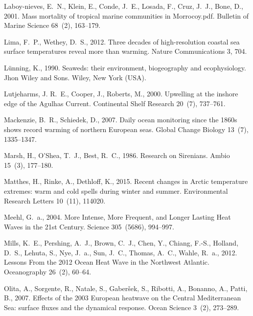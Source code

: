 \documentclass[a4paper,10pt,review]{elsarticle}
\begin{document}
\begin{thebibliography}{52}
Laboy-nieves, E.~N., Klein, E., Conde, J.~E., Losada, F., Cruz, J.~J., Bone,
  D., 2001. {Mass mortality of tropical marine communities in Morrocoy.pdf}.
  Bulletin of Marine Science 68~(2), 163--179.

Lima, F.~P., Wethey, D.~S., 2012. {Three decades of high-resolution coastal sea
  surface temperatures reveal more than warming}. Nature Communications 3, 704.

L{\"{u}}nning, K., 1990. {Seaweds: their environment, biogeography and
  ecophysiology. Jhon Wiley and Sons}. Wiley, New York (USA).

Lutjeharms, J. R.~E., Cooper, J., Roberts, M., 2000. {Upwelling at the inshore
  edge of the Agulhas Current}. Continental Shelf Research 20~(7), 737--761.

Mackenzie, B.~R., Schiedek, D., 2007. {Daily ocean monitoring since the 1860s
  shows record warming of northern European seas}. Global Change Biology
  13~(7), 1335--1347.

Marsh, H., O'Shea, T.~J., Best, R.~C., 1986. {Research on Sirenians}. Ambio
  15~(3), 177--180.

Matthes, H., Rinke, A., Dethloff, K., 2015. {Recent changes in Arctic
  temperature extremes: warm and cold spells during winter and summer}.
  Environmental Research Letters 10~(11), 114020.

Meehl, G.~a., 2004. {More Intense, More Frequent, and Longer Lasting Heat Waves
  in the 21st Century}. Science 305~(5686), 994--997.

Mills, K.~E., Pershing, A.~J., Brown, C.~J., Chen, Y., Chiang, F.-S., Holland,
  D.~S., Lehuta, S., Nye, J.~a., Sun, J.~C., Thomas, A.~C., Wahle, R.~a., 2012.
  {Lessons From the 2012 Ocean Heat Wave in the Northwest Atlantic}.
  Oceanography 26~(2), 60--64.

Olita, A., Sorgente, R., Natale, S., Gaber{\v{s}}ek, S., Ribotti, A., Bonanno,
  A., Patti, B., 2007. {Effects of the 2003 European heatwave on the Central
  Mediterranean Sea: surface fluxes and the dynamical response}. Ocean Science
  3~(2), 273--289.


\end{thebibliography}
\end{document}
